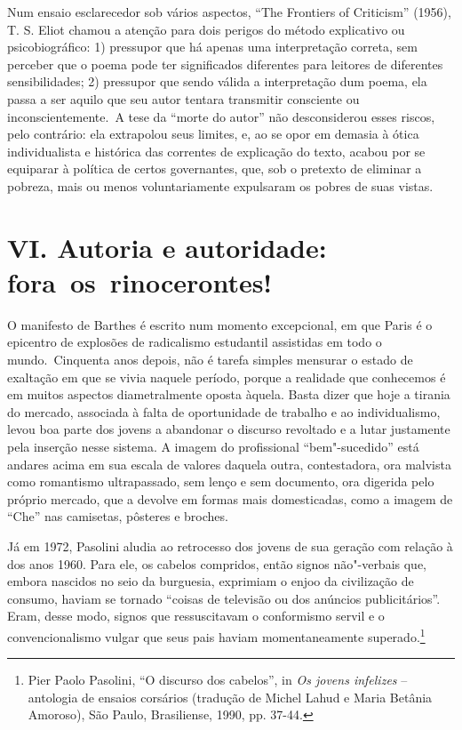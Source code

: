 Num ensaio esclarecedor sob vários aspectos, ``The Frontiers of
Criticism'' (1956), T. S. Eliot chamou a atenção para dois perigos do
método explicativo ou psicobiográfico: 1) pressupor que há apenas uma
interpretação correta, sem perceber que o poema pode ter significados
diferentes para leitores de diferentes sensibilidades; 2) pressupor que
sendo válida a interpretação dum poema, ela passa a ser aquilo que seu
autor tentara transmitir consciente ou inconscientemente.~A tese da
``morte do autor'' não desconsiderou esses riscos, pelo contrário: ela
extrapolou seus limites, e, ao se opor em demasia à ótica individualista
e histórica das correntes de explicação do texto, acabou por se
equiparar à política de certos governantes, que, sob o pretexto de
eliminar a pobreza, mais ou menos voluntariamente expulsaram os pobres
de suas vistas.

\section*{VI. Autoria e autoridade: fora~os~rinocerontes!}

O manifesto de Barthes é escrito num momento excepcional, em que Paris é
o epicentro de explosões de radicalismo estudantil assistidas em todo o
mundo.~Cinquenta anos depois, não é tarefa simples mensurar o estado de
exaltação em que se vivia naquele período, porque a realidade que
conhecemos é em muitos aspectos diametralmente oposta àquela. Basta
dizer que hoje a tirania do mercado, associada à falta de oportunidade
de trabalho e ao individualismo, levou boa parte dos jovens a abandonar
o discurso revoltado e a lutar justamente pela inserção nesse sistema. A
imagem do profissional ``bem"-sucedido'' está andares acima em sua escala
de valores daquela outra, contestadora, ora malvista como romantismo
ultrapassado, sem lenço e sem documento, ora digerida pelo próprio
mercado, que a devolve em formas mais domesticadas, como a imagem de
``Che'' nas camisetas, pôsteres e broches.

Já em 1972, Pasolini aludia ao retrocesso dos jovens de sua geração com
relação à dos anos 1960. Para ele, os cabelos compridos, então signos
não"-verbais que, embora nascidos no seio da burguesia, exprimiam o enjoo
da civilização de consumo, haviam se tornado ``coisas de televisão ou
dos anúncios publicitários''. Eram, desse modo, signos que ressuscitavam
o conformismo servil e o convencionalismo vulgar que seus pais haviam
momentaneamente superado.\footnote{Pier Paolo Pasolini, ``O discurso dos
  cabelos'', in \emph{Os jovens infelizes} -- antologia de ensaios
  corsários (tradução de Michel Lahud e Maria Betânia Amoroso), São
  Paulo, Brasiliense, 1990, pp. 37-44.}

